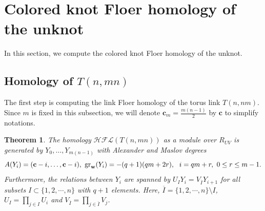 \documentclass{amsart}
\newtheorem{theorem}{Theorem}[section]
\newcommand{\cHFL}{\mathcal{H\!F\! L}}
\newcommand{\G}{\mathcal{G}}
\newcommand{\w}{\mathbf{w}}
\newcommand{\x}{\mathbf{x}}
\def\gr{\textup{gr}}
\def\w{{\bf{w}}}
\def\x{\mathbf{x}}
\newcommand{\cc}{\mathbf{c}}
\begin{document}

\section{Colored knot Floer homology of the unknot}

In this section, we compute the colored knot Floer homology of the unknot.  %


\subsection{Homology of $T(n,mn)$} The first step is computing the link Floer homology of the torus link $T(n,nm)$. Since $m$ is fixed in this subsection, we will denote $\cc_m=\frac{m(n-1)}{2}$ by $\cc$ to simplify notations. 

\begin{theorem}
\label{thm: Tnm}
The homology $\cHFL(T(n,mn))$ as a module over $R_{UV}$ is generated by $Y_0,\ldots,Y_{m(n-1)}$ with Alexander and Maslov degrees 
$$
A(Y_i)=(\cc-i,\ldots,\cc-i),\ \gr_{\w}(Y_i)=-(q+1)(qm+2r),\ \ i=qm+r,\ 0\le r\le m-1.
$$
Furthermore, the relations between $Y_i$ are spanned by $U_IY_i=V_{\overline{I}}Y_{i+1}$ for all subsets $I\subset\{1,2,\cdots,n\}$ with $q+1$ elements. Here, $\overline{I}=\{1,2,\cdots,n\}\setminus I$, $U_I=\prod_{j\in I}U_i$ and $V_{\overline{I}}=\prod_{j\in \overline{I}}V_j$.
\end{theorem}
\end{document}
